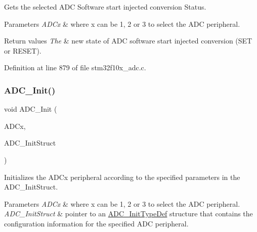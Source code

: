 Gets the selected A\+DC Software start injected conversion Status. 


\begin{DoxyParams}{Parameters}
{\em A\+D\+Cx} & where x can be 1, 2 or 3 to select the A\+DC peripheral. \\
\hline
\end{DoxyParams}

\begin{DoxyRetVals}{Return values}
{\em The} & new state of A\+DC software start injected conversion (S\+ET or R\+E\+S\+ET). \\
\hline
\end{DoxyRetVals}


Definition at line 879 of file stm32f10x\+\_\+adc.\+c.

\mbox{\label{group___a_d_c___private___functions_gabbab6038cf8691404350625e477254f9}} 
\subsubsection{\texorpdfstring{A\+D\+C\+\_\+\+Init()}{ADC\_Init()}}
{\footnotesize\ttfamily void A\+D\+C\+\_\+\+Init (\begin{DoxyParamCaption}\item[{\hyperlink{struct_a_d_c___type_def}{A\+D\+C\+\_\+\+Type\+Def} $\ast$}]{A\+D\+Cx,  }\item[{\hyperlink{struct_a_d_c___init_type_def}{A\+D\+C\+\_\+\+Init\+Type\+Def} $\ast$}]{A\+D\+C\+\_\+\+Init\+Struct }\end{DoxyParamCaption})}



Initializes the A\+D\+Cx peripheral according to the specified parameters in the A\+D\+C\+\_\+\+Init\+Struct. 


\begin{DoxyParams}{Parameters}
{\em A\+D\+Cx} & where x can be 1, 2 or 3 to select the A\+DC peripheral. \\
\hline
{\em A\+D\+C\+\_\+\+Init\+Struct} & pointer to an \hyperlink{struct_a_d_c___init_type_def}{A\+D\+C\+\_\+\+Init\+Type\+Def} structure that contains the configuration information for the specified A\+DC peripheral. \\
\hline
\end{DoxyParams}


